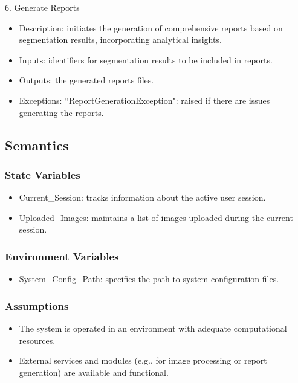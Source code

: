 \documentclass[12pt, titlepage]{article}
\begin{document}
6. Generate Reports
\begin{itemize}
    \item Description: initiates the generation of comprehensive reports based on segmentation results, incorporating analytical insights.
    \item Inputs: identifiers for segmentation results to be included in reports.
    \item Outputs: the generated reports files.
    \item Exceptions: ``ReportGenerationException": raised if there are issues generating the reports.
\end{itemize}


\subsection{Semantics}

\subsubsection{State Variables}
\begin{itemize}
    \item Current\_Session: tracks information about the active user session. 
    \item Uploaded\_Images: maintains a list of images uploaded during the current session.
\end{itemize}

\subsubsection{Environment Variables}
\begin{itemize}
    \item System\_Config\_Path: specifies the path to system configuration files.
\end{itemize}


\subsubsection{Assumptions}
\begin{itemize}
    \item The system is operated in an environment with adequate computational resources.
    \item External services and modules (e.g., for image processing or report generation) are available and functional.
\end{itemize}
\end{document}
